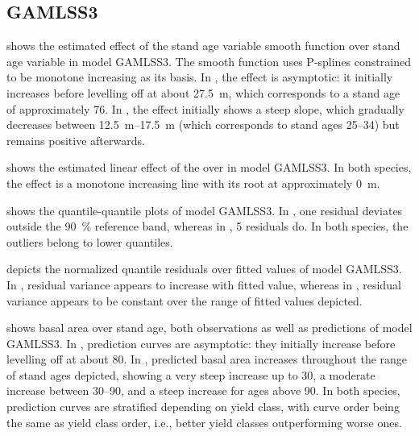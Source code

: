 \subsection{GAMLSS3}

 shows the estimated effect of the stand age variable smooth function over stand age variable in model GAMLSS3.  The smooth function uses P-splines constrained to be monotone increasing as its basis.  In \Beech{}, the effect is asymptotic:  it initially increases before levelling off at about \SI{27.5}{\meter}, which corresponds to a stand age of approximately \SI{76}{\year}.  In \Spruce{}, the effect initially shows a steep slope, which gradually decreases between \SIrange{12.5}{17.5}{\meter} (which corresponds to stand ages \SIrange{25}{34}{\year}) but remains positive afterwards.

 shows the estimated linear effect of the \ProductivityIndexVariableText{} over \ProductivityIndexVariableText{} in model GAMLSS3.  In both species, the effect is a monotone increasing line with its root at approximately \SI{0}{\meter}.

 shows the quantile-quantile plots of model GAMLSS3.  In \Beech{}, one residual deviates outside the \SI{90}{\percent} reference band, whereas in \Spruce{}, \num{5} residuals do.  In both species, the outliers belong to lower quantiles.

 depicts the normalized quantile residuals over fitted values of model GAMLSS3.  In \Beech{}, residual variance appears to increase with fitted value, whereas in \Spruce{}, residual variance appears to be constant over the range of fitted values depicted.

 shows basal area over stand age, both observations as well as predictions of model GAMLSS3.  In \Beech{}, prediction curves are asymptotic:  they initially increase before levelling off at about \SI{80}{\year}.  In \Spruce{}, predicted basal area increases throughout the range of stand ages depicted, showing a very steep increase up to \SI{30}{\year}, a moderate increase between \SIrange{30}{90}{\year}, and a steep increase for ages above \SI{90}{\year}.  In both species, prediction curves are stratified depending on yield class, with curve order being the same as yield class order, i.e., better yield classes outperforming worse ones.

